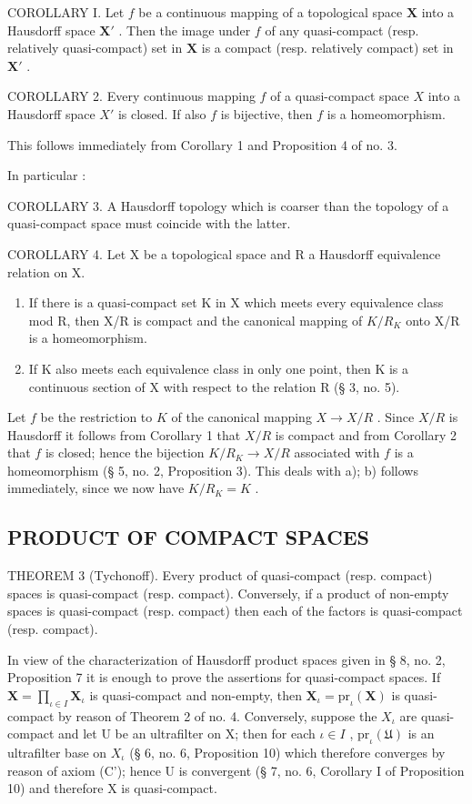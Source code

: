 COROLLARY I. Let \(f\) be a continuous mapping of a topological space \(\mathbf{X}\) into a Hausdorff space \(\mathbf{X}'\) . Then the image under \(f\) of any quasi-compact (resp. relatively quasi-compact) set in \(\mathbf{X}\) is a compact (resp. relatively compact) set in \(\mathbf{X}'\) .

COROLLARY 2. Every continuous mapping \(f\) of a quasi-compact space \(X\) into a Hausdorff space \(X'\) is closed. If also \(f\) is bijective, then \(f\) is a homeomorphism.

This follows immediately from Corollary 1 and Proposition 4 of no. 3.

In particular :

COROLLARY 3. A Hausdorff topology which is coarser than the topology of a quasi-compact space must coincide with the latter.

COROLLARY 4. Let X be a topological space and R a Hausdorff equivalence relation on X.

\begin{enumerate}
\def\labelenumi{\alph{enumi})}
\item
  If there is a quasi-compact set K in X which meets every equivalence class mod R, then X/R is compact and the canonical mapping of \(K/R_{K}\) onto X/R is a homeomorphism.
\item
  If K also meets each equivalence class in only one point, then K is a continuous section of X with respect to the relation R (§ 3, no. 5).
\end{enumerate}

Let \(f\) be the restriction to \(K\) of the canonical mapping \(X \to X / R\) . Since \(X / R\) is Hausdorff it follows from Corollary 1 that \(X / R\) is compact and from Corollary 2 that \(f\) is closed; hence the bijection \(K / R_K \to X / R\) associated with \(f\) is a homeomorphism (§ 5, no. 2, Proposition 3). This deals with a); b) follows immediately, since we now have \(K / R_K = K\) .

\subsection{PRODUCT OF COMPACT SPACES}

THEOREM 3 (Tychonoff). Every product of quasi-compact (resp. compact) spaces is quasi-compact (resp. compact). Conversely, if a product of non-empty spaces is quasi-compact (resp. compact) then each of the factors is quasi-compact (resp. compact).

In view of the characterization of Hausdorff product spaces given in § 8, no. 2, Proposition 7 it is enough to prove the assertions for quasi-compact spaces. If \(\mathbf{X} = \prod_{\iota \in I} \mathbf{X}_{\iota}\) is quasi-compact and non-empty, then \(\mathbf{X}_{\iota}=\mathrm{pr}_{\iota}(\mathbf{X})\) is quasi-compact by reason of Theorem 2 of no. 4. Conversely, suppose the \(X_{\iota}\) are quasi-compact and let U be an ultrafilter on X; then for each \(\iota\in I\) , \(\mathrm{pr}_{\iota}(\mathfrak{U})\) is an ultrafilter base on \(X_{\iota}\) (§ 6, no. 6, Proposition 10) which therefore converges by reason of axiom (C'); hence U is convergent (§ 7, no. 6, Corollary I of Proposition 10) and therefore X is quasi-compact.

